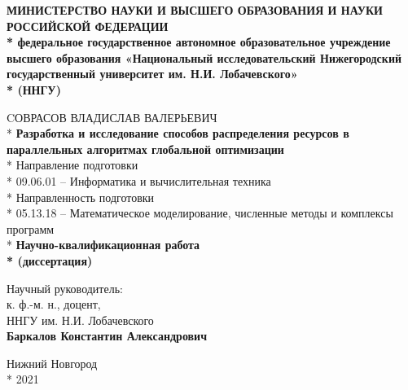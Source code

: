 \begin{titlepage}

\begin{center}
  \fontsize{12pt}{0pt}
  \textbf{МИНИСТЕРСТВО НАУКИ И ВЫСШЕГО ОБРАЗОВАНИЯ И НАУКИ РОССИЙСКОЙ ФЕДЕРАЦИИ \\*
федеральное государственное автономное образовательное учреждение высшего образования
«Национальный исследовательский Нижегородский государственный университет им. Н.И.
Лобачевского»\\*
(ННГУ)}
\end{center}

\vspace{12pt}
\vspace{25pt}

\begin{center}
\fontsize{14pt}{0pt}

\vspace{12pt}

CОВРАСОВ ВЛАДИСЛАВ ВАЛЕРЬЕВИЧ\\*
\vspace{12pt}
\vspace{25pt}
\textbf{Разработка и исследование способов распределения ресурсов в
параллельных алгоритмах глобальной оптимизации}\\*
\vspace{14pt}
\fontsize{12pt}{0pt}
  Направление подготовки\\*
09.06.01 – Информатика и вычислительная
техника\\*
\vspace{14pt}
Направленность подготовки\\*
05.13.18 – Математическое моделирование,
численные методы и комплексы программ\\*
\vspace{14pt}
\vspace{14pt}
\fontsize{14pt}{0pt}
\textbf{Научно-квалификационная работа\\*
(диссертация)}
\end{center}

\vspace{40pt}


\fontsize{12pt}{0pt}
\begin{flushright}
Научный руководитель:\\
\vspace{14pt}
к. ф.-м. н., доцент,\\
ННГУ им. Н.И. Лобачевского\\
\textbf{Баркалов Константин Александрович}\\
\end{flushright}

\vspace{30pt}

\vspace{\fill}

\begin{center}
Нижний Новгород \\*
2021
\end{center}

\end{titlepage}
